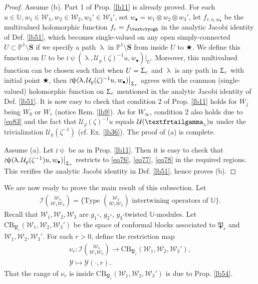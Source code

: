 \documentclass[11pt,b5paper,notitlepage]{article}
\theoremstyle{definition}
\theoremstyle{plain}
\newcommand{\fk}{\mathfrak}
\newcommand{\mc}{\mathcal}
\newcommand{\blt}{\bullet}
\newcommand{\Ubb}{\mathbb U}
\newcommand{\Pbb}{\mathbb P}
\newcommand{\Sbf}{\mathbf{S}}
\newcommand{\CB}{\mathrm{CB}}
\newcommand{\tipaz}{\text{\textctyogh}}
\newcommand{\tipxgamma}{\text{\textfrtailgamma}}
\numberwithin{equation}{subsection}
\begin{document}
\begin{proof}
Assume (b). Part 1 of Prop. \ref{lb11} is already proved. For each $u\in\Ubb,w_1\in\mc W_1,w_2\in\mc W_2,w_3'\in\mc W_3'$, set $w_\blt=w_1\otimes w_2\otimes w_3'$, let $f_{r,u,w_\blt}$ be the multivalued holomorphic function $f_r=f_\tipaz$ in the analytic Jacobi identity of Def. \ref{lb51}, which becomes single-valued on any open simply-connected  $U\subset\Pbb^1\setminus\Sbf$ if we specify a path $\uplambda$ in $\Pbb^1\setminus\Sbf$ from inside $U$ to $\bigstar$.  We define this function on $U$ to be $\wr\uppsi(\uplambda,\mc U_\varrho(\zeta)^{-1}u,w_\blt)\big|_U$. Moreover, this multivalued function can be chosen such that when $U=\Upsigma_r$ and $\uplambda$ is any path in $\Upsigma_r$ with initial point $\bigstar$, then $\wr\uppsi(\uplambda,\mc U_\varrho(\zeta)^{-1}u,w_\blt)\big|_{\Upsigma_r}$ agrees with the common (single-valued) holomorphic function on $\Upsigma_r$ mentioned in the analytic Jacobi identity of Def. \ref{lb51}. It is now easy to check that condition 2 of Prop. \ref{lb11} holds for $W_j$ being $W_0$ or $W_r$ (notice Rem. \ref{lb9}). As for $W_\infty$, condition 2 also holds due to \eqref{eq83} and the fact that $\mc U_\varrho(\zeta)^{-1}u$ equals $\mc U(\tipxgamma_z)u$ under the trivialization $\mc U_\varrho(\zeta^{-1})$  (cf. Ex. \ref{lb36}). The proof of (a) is complete.

Assume (a). Let $\wr\uppsi$ be as in Prop. \ref{lb11}. Then it is easy to check that $\wr\uppsi(\uplambda,\mc U_\varrho(\zeta^{-1})u,w_\blt)\big|_{\Upsigma_r}$ restricts to \eqref{eq76}, \eqref{eq77}, \eqref{eq78} in the required regions. This verifies the analytic Jacobi identity in Def. \ref{lb51}, hence proves (b).
\end{proof}






We are now ready to prove the main result of this subsection. Let
\begin{align*}
\mc I{\mc W_3\choose \mc W_1\mc W_3}=\bigg\{\text{Type }{\mc W_3\choose \mc W_1\mc W_2}\text{ intertwining operators of }\Ubb\bigg\}.	
\end{align*}
Recall that $\mc W_1,\mc W_2,\mc W_3$ are  $g_1$-, $g_2$-, $g_3$-twisted $\Ubb$-modules. Let $\CB_{\fk P_r}(\mc W_1,\mc W_2,\mc W_3')$ be the space of conformal blocks associated to $\fk P_r$ and $\mc W_1,\mc W_2,\mc W_3'$. For each $r>0$, define the restriction map
\begin{gather*}
\nu_r:	\mc I{\mc W_3\choose \mc W_1\mc W_2}\rightarrow \CB_{\fk P_r}(\mc W_1,\mc W_2,\mc W_3'),\\
\mc Y\mapsto \mc Y(\cdot,r).
\end{gather*}
That the range of $\nu_r$ is inside $ \CB_{\fk P_r}(\mc W_1,\mc W_2,\mc W_3')$ is due to Prop. \ref{lb54}.
\end{document}
